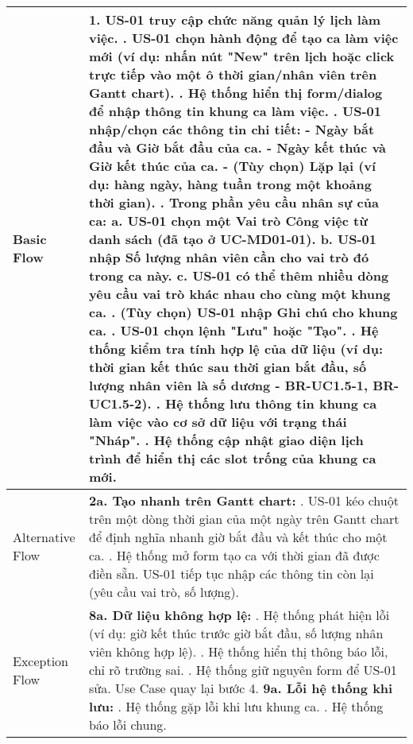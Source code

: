 \begin{longtable}{|m{4cm}|p{11cm}|}
Basic Flow & 1. US-01 truy cập chức năng quản lý lịch làm việc. \newline 2. US-01 chọn hành động để tạo ca làm việc mới (ví dụ: nhấn nút "New" trên lịch hoặc click trực tiếp vào một ô thời gian/nhân viên trên Gantt chart). \newline 3. Hệ thống hiển thị form/dialog để nhập thông tin khung ca làm việc. \newline 4. US-01 nhập/chọn các thông tin chi tiết: \newline    - Ngày bắt đầu và Giờ bắt đầu của ca. \newline    - Ngày kết thúc và Giờ kết thúc của ca. \newline    - (Tùy chọn) Lặp lại (ví dụ: hàng ngày, hàng tuần trong một khoảng thời gian). \newline 5. Trong phần yêu cầu nhân sự của ca: \newline    a. US-01 chọn một Vai trò Công việc từ danh sách (đã tạo ở UC-MD01-01). \newline    b. US-01 nhập Số lượng nhân viên cần cho vai trò đó trong ca này. \newline    c. US-01 có thể thêm nhiều dòng yêu cầu vai trò khác nhau cho cùng một khung ca. \newline 6. (Tùy chọn) US-01 nhập Ghi chú cho khung ca. \newline 7. US-01 chọn lệnh "Lưu" hoặc "Tạo". \newline 8. Hệ thống kiểm tra tính hợp lệ của dữ liệu (ví dụ: thời gian kết thúc sau thời gian bắt đầu, số lượng nhân viên là số dương - BR-UC1.5-1, BR-UC1.5-2). \newline 9. Hệ thống lưu thông tin khung ca làm việc vào cơ sở dữ liệu với trạng thái "Nháp". \newline 10. Hệ thống cập nhật giao diện lịch trình để hiển thị các slot trống của khung ca mới. \\
\hline
Alternative Flow & \textbf{2a. Tạo nhanh trên Gantt chart:} \newline    1. US-01 kéo chuột trên một dòng thời gian của một ngày trên Gantt chart để định nghĩa nhanh giờ bắt đầu và kết thúc cho một ca. \newline    2. Hệ thống mở form tạo ca với thời gian đã được điền sẵn. US-01 tiếp tục nhập các thông tin còn lại (yêu cầu vai trò, số lượng). \\
\hline
Exception Flow & \textbf{8a. Dữ liệu không hợp lệ:} \newline    1. Hệ thống phát hiện lỗi (ví dụ: giờ kết thúc trước giờ bắt đầu, số lượng nhân viên không hợp lệ). \newline    2. Hệ thống hiển thị thông báo lỗi, chỉ rõ trường sai. \newline    3. Hệ thống giữ nguyên form để US-01 sửa. Use Case quay lại bước 4. \newline \textbf{9a. Lỗi hệ thống khi lưu:} \newline    1. Hệ thống gặp lỗi khi lưu khung ca. \newline    2. Hệ thống báo lỗi chung. \\

\end{longtable}
